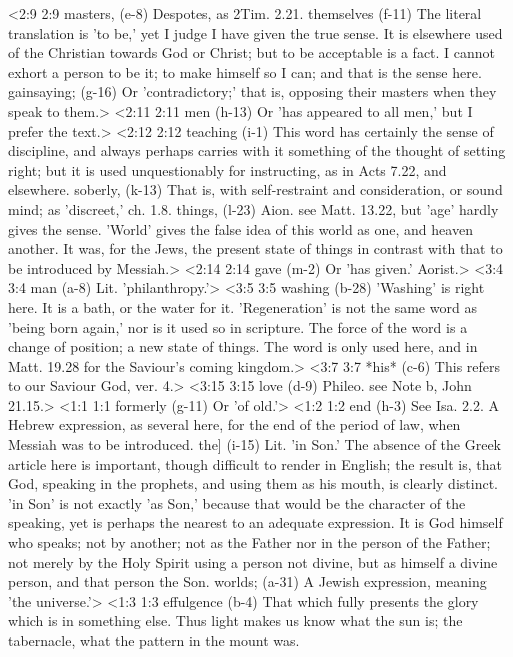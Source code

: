 <2:9 2:9  masters, (e-8)  Despotes, as 2Tim. 2.21.
  themselves (f-11)  The literal translation is 'to be,' yet I judge I have given  the true sense. It is elsewhere used of the Christian towards  God or Christ; but to be acceptable is a fact. I cannot exhort  a person to be it; to make himself so I can; and that is  the sense here.
  gainsaying; (g-16)  Or 'contradictory;' that is, opposing their masters when they  speak to them.>
<2:11 2:11  men (h-13)  Or 'has appeared to all men,' but I prefer the text.>
<2:12 2:12  teaching (i-1)  This word has certainly the sense of discipline, and always  perhaps carries with it something of the thought of setting  right; but it is used unquestionably for instructing, as in  Acts 7.22, and elsewhere.
  soberly, (k-13)  That is, with self-restraint and consideration, or sound  mind; as 'discreet,' ch. 1.8.
  things, (l-23)  Aion. see Matt. 13.22, but 'age' hardly gives the sense.  'World' gives the false idea of this world as one, and heaven  another. It was, for the Jews, the present state of things in  contrast with that to be introduced by Messiah.>
<2:14 2:14  gave (m-2)  Or 'has given.' Aorist.>
<3:4 3:4  man (a-8)  Lit. 'philanthropy.'>
<3:5 3:5  washing (b-28)  'Washing' is right here. It is a bath, or the water for it.  'Regeneration' is not the same word as 'being born again,' nor  is it used so in scripture. The force of the word is a change  of position; a new state of things. The word is only used here,  and in Matt. 19.28 for the Saviour's coming kingdom.>
<3:7 3:7  *his* (c-6)  This refers to our Saviour God, ver. 4.>
<3:15 3:15  love (d-9)  Phileo. see Note b, John 21.15.>
<1:1 1:1  formerly (g-11)  Or 'of old.'>
<1:2 1:2  end (h-3)  See Isa. 2.2. A Hebrew expression, as several here, for the  end of the period of law, when Messiah was to be introduced.
  the] (i-15)  Lit. 'in Son.' The absence of the Greek article here is  important, though difficult to render in English; the result  is, that God, speaking in the prophets, and using them as his  mouth, is clearly distinct. 'in Son' is not exactly 'as Son,'  because that would be the character of the speaking, yet is  perhaps the nearest to an adequate expression. It is God  himself who speaks; not by another; not as the Father nor in  the person of the Father; not merely by the Holy Spirit using a  person not divine, but as himself a divine person, and that  person the Son.
  worlds; (a-31)  A Jewish expression, meaning 'the universe.'>
<1:3 1:3  effulgence (b-4)  That which fully presents the glory which is in something  else. Thus light makes us know what the sun is; the tabernacle,  what the pattern in the mount was.
